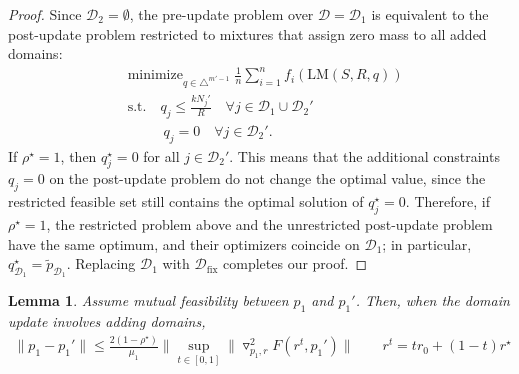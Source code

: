 \documentclass[table]{ai2style/ai2}
\newtheorem{lemma}{Lemma}
\newcommand{\D}[0]{\mathcal{D}}
\newcommand{\LM}[0]{\text{LM}}
\newcommand{\Dfix}[0]{\mathcal{D}_{\text{fix}}}
\begin{document}
\begin{proof}
Since $\D_2=\emptyset$, the pre-update problem over $\D=\D_1$ is equivalent to the post-update problem restricted to mixtures that assign zero mass to all added domains:
\begin{align*}
    &\text{minimize}_{q\in\triangle^{m'-1}} \; \frac{1}{n} \sum_{i = 1}^n f_i(\LM(S, R, q)) \\
    &\text{s.t.}\quad q_j \le \frac{kN_j'}{R}\quad \forall j\in\D_1\cup\D_2' \\
    &\qquad\;\; q_j = 0 \quad \forall j\in\D_2'.
\end{align*}
If $\rho^\star=1$, then $q_j^\star=0$ for all $j\in\D_2'$. This means that the additional constraints $q_j=0$ on the post-update problem do not change the optimal value, since the restricted feasible set still contains the optimal solution of $q_j^\star = 0$. Therefore, if $\rho^\star = 1$, the restricted problem above and the unrestricted post-update problem have the same optimum, and their optimizers coincide on $\D_1$; in particular, $q^\star_{\D_1}=\tilde p_{\D_1}$. Replacing $\D_1$ with $\Dfix$ completes our proof.
\end{proof}

\begin{lemma}\label{lemma:add_bound}
Assume mutual feasibility between $p_1$ and $p_1'$. Then, when the domain update involves adding domains,
\begin{align*}
     \| p_1 - p_1' \| \le \frac{2(1 - \rho^\star)}{\mu_1} \| \sup_{t \in [0, 1]}  \| \triangledown_{p_1, r}^2 F(r^t, p_1') \| \qquad r^t = t r_0+(1 - t)r^\star
\end{align*}

\end{lemma}
\end{document}
